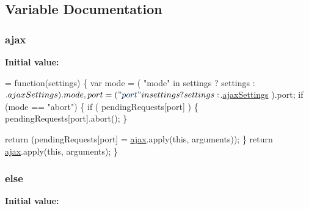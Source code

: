 \subsection{Variable Documentation}
\hypertarget{_bibabook_2_scripts_2jquery_8validate-vsdoc_8js_a77004c0fdc08a5bc07afa0b099cdf6df}{}
\subsubsection[{ajax}]{\setlength{\rightskip}{0pt plus 5cm}ajax}\label{_bibabook_2_scripts_2jquery_8validate-vsdoc_8js_a77004c0fdc08a5bc07afa0b099cdf6df}
{\bfseries Initial value\+:}
\begin{DoxyCode}
= \textcolor{keyword}{function}(settings) \{
            var mode = ( \textcolor{stringliteral}{"mode"} in settings ? settings : $.ajaxSettings ).mode,
                port = ( \textcolor{stringliteral}{"port"} in settings ? settings : $.\hyperlink{jquery-1_810_82-vsdoc_8js_adcbb4ce9148aaf3a9a165b2ac462163b}{ajaxSettings} ).port;
            \textcolor{keywordflow}{if} (mode == \textcolor{stringliteral}{"abort"}) \{
                \textcolor{keywordflow}{if} ( pendingRequests[port] ) \{
                    pendingRequests[port].abort();
                \}

                \textcolor{keywordflow}{return} (pendingRequests[port] = \hyperlink{_bibabook_2_scripts_2jquery_8validate-vsdoc_8js_a77004c0fdc08a5bc07afa0b099cdf6df}{ajax}.apply(\textcolor{keyword}{this}, arguments));
            \}
            \textcolor{keywordflow}{return} \hyperlink{_bibabook_2_scripts_2jquery_8validate-vsdoc_8js_a77004c0fdc08a5bc07afa0b099cdf6df}{ajax}.apply(\textcolor{keyword}{this}, arguments);
        \}
\end{DoxyCode}
\hypertarget{_bibabook_2_scripts_2jquery_8validate-vsdoc_8js_a0544c3fe466e421738dae463968b70ba}{}
\subsubsection[{else}]{\setlength{\rightskip}{0pt plus 5cm}else}\label{_bibabook_2_scripts_2jquery_8validate-vsdoc_8js_a0544c3fe466e421738dae463968b70ba}
{\bfseries Initial value\+:}
\hypertarget{_bibabook_2_scripts_2jquery_8validate-vsdoc_8js_a387137c43ed9616d39ba90e890d181eb}{}
